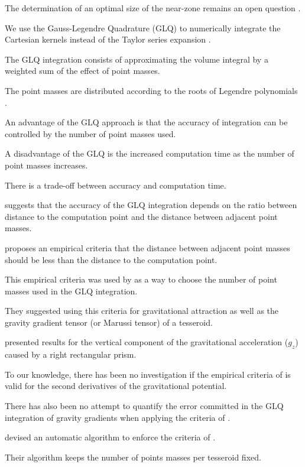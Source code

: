 \documentclass[paper,twocolumn]{geophysics}
\begin{document}
The determination of an optimal size of the near-zone remains an open question
\citep{Grombein2013}.

We use the Gauss-Legendre Quadrature (GLQ) to numerically integrate the Cartesian
kernels instead of the Taylor series expansion \citep{Asgharzadeh2007}.

The GLQ integration consists of approximating the volume integral by a weighted sum of
the effect of point masses.

The point masses are distributed according to the roots of Legendre polynomials
\citep{Hildebrand1987}.

An advantage of the GLQ approach is that the accuracy of integration can be
controlled by the number of point masses used.

A disadvantage of the GLQ is the increased computation time as the number of
point masses increases.

There is a trade-off between accuracy and computation time.

\citet{Ku1977} suggests that the accuracy of the GLQ integration depends on
the ratio between distance to the computation point and the distance between
adjacent point masses.

\citet{Ku1977} proposes an empirical criteria that the distance between adjacent
point masses should be less than the distance to the computation point.

This empirical criteria was used by \citet{Asgharzadeh2007} as a way to
choose the number of point masses used in the GLQ integration.

They suggested using this criteria for gravitational attraction as well as
the gravity gradient tensor (or Marussi tensor) of a tesseroid.

\citet{Ku1977} presented results for the vertical component of the
gravitational acceleration ($g_z$) caused by a right rectangular prism.

To our knowledge, there has been no investigation if the empirical criteria of
\citet{Ku1977} is valid for the second derivatives of the
gravitational potential.

There has also been no attempt to quantify the error committed in the GLQ
integration of gravity gradients when applying the criteria of \citet{Ku1977}.

\citet{Li2011} devised an automatic algorithm to enforce the criteria of
\citet{Ku1977}.

Their algorithm keeps the number of points masses per tesseroid fixed.
\end{document}
